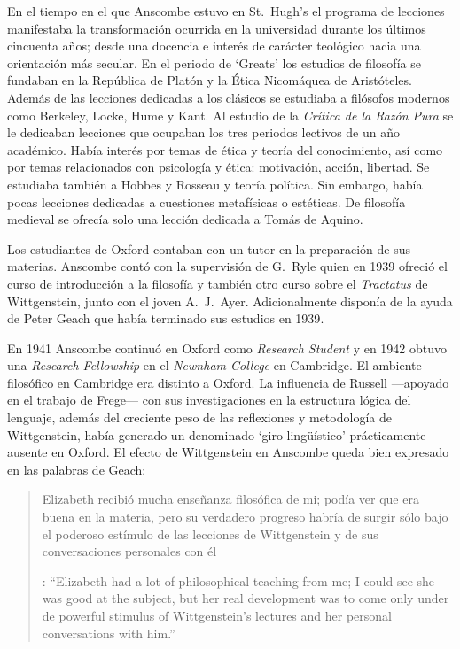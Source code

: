 En el tiempo en el que Anscombe estuvo en St.~Hugh's el programa de lecciones manifestaba la transformación ocurrida en la universidad durante los últimos cincuenta años; desde una docencia e interés de carácter teológico hacia una orientación más secular. En el periodo de `Greats' los estudios de filosofía se fundaban en la República de Platón y la Ética Nicomáquea de Aristóteles. Además de las lecciones dedicadas a los clásicos se estudiaba a filósofos modernos como Berkeley, Locke, Hume y Kant. Al estudio de la \emph{Crítica de la Razón Pura} se le dedicaban lecciones que ocupaban los tres periodos lectivos de un año académico. Había interés por temas de ética y teoría del conocimiento, así como por temas relacionados con psicología y ética: motivación, acción, libertad. Se estudiaba también a Hobbes y Rosseau y teoría política. Sin embargo, había pocas lecciones dedicadas a cuestiones metafísicas o estéticas. De filosofía medieval se ofrecía solo una lección dedicada a Tomás de Aquino\autocite[Cf.~][23-24]{torralba2005accion}.

Los estudiantes de Oxford contaban con un tutor en la preparación de sus materias. Anscombe contó con la supervisión de G.~Ryle quien en 1939 ofreció el curso de introducción a la filosofía y también otro curso sobre el \emph{Tractatus} de Wittgenstein, junto con el joven A.~J.~Ayer. Adicionalmente disponía de la ayuda de Peter Geach que había terminado sus estudios en 1939\autocite[Cf.~][24]{torralba2005accion}.

En 1941 Anscombe continuó en Oxford como \emph{Research Student} y en 1942 obtuvo una \emph{Research Fellowship} en el \emph{Newnham College} en Cambridge. El ambiente filosófico en Cambridge era distinto a Oxford. La influencia de Russell ---apoyado en el trabajo de Frege--- con sus investigaciones en la estructura lógica del lenguaje, además del creciente peso de las reflexiones y metodología de Wittgenstein, había generado un denominado `giro lingüístico'\autocite[Cf.~][14]{geach1991philaut} prácticamente ausente en Oxford. El efecto de Wittgenstein en Anscombe queda bien expresado en las palabras de Geach: \blockquote[{\cite[11]{geach1991philaut}}: \enquote{Elizabeth had a lot of philosophical teaching from me; I could see she was good at the subject, but her real development was to come only under de powerful stimulus of Wittgenstein's lectures and her personal conversations with him.}]{Elizabeth recibió mucha enseñanza filosófica de mi; podía ver que era buena en la materia, pero su verdadero progreso habría de surgir sólo bajo el poderoso estímulo de las lecciones de Wittgenstein y de sus conversaciones personales con él}.

